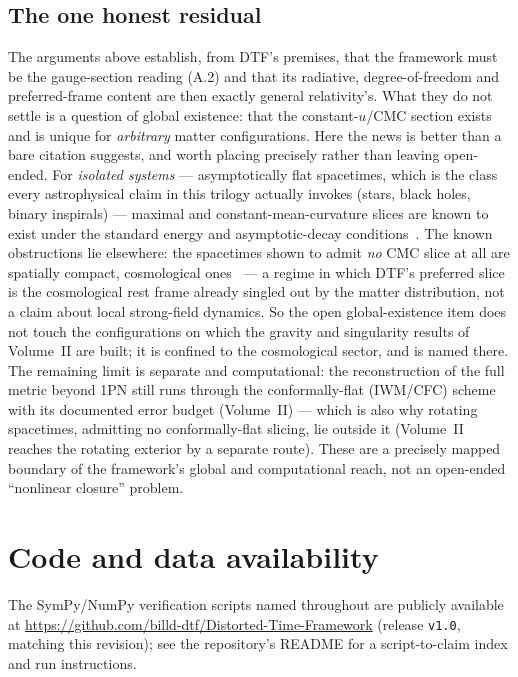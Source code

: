 \documentclass[11pt]{article}
\begin{document}
\subsection*{The one honest residual}
The arguments above establish, from DTF's premises, that the framework must be the gauge-section reading
(A.2) and that its radiative, degree-of-freedom and preferred-frame content are then exactly general
relativity's. What they do not settle is a question of global existence: that the constant-$u$/CMC section
exists and is unique for \emph{arbitrary} matter configurations. Here the news is better than a bare
citation suggests, and worth placing precisely rather than leaving open-ended. For \emph{isolated systems}
--- asymptotically flat spacetimes, which is the class every astrophysical claim in this trilogy actually
invokes (stars, black holes, binary inspirals) --- maximal and constant-mean-curvature slices are known to
exist under the standard energy and asymptotic-decay conditions~\cite{Bartnik1984,MarsdenTipler1980,Gerhardt1983}.
The known obstructions lie elsewhere: the spacetimes shown to admit \emph{no} CMC slice at all are
spatially compact, cosmological ones~\cite{Bartnik1988} --- a regime in which DTF's preferred slice is the
cosmological rest frame already singled out by the matter distribution, not a claim about local strong-field
dynamics. So the open global-existence item does not touch the configurations on which the gravity and
singularity results of Volume~II are built; it is confined to the cosmological sector, and is named there.
The remaining limit is separate and computational: the reconstruction of the full metric beyond 1PN still
runs through the conformally-flat (IWM/CFC) scheme with its documented error budget (Volume~II) --- which is
also why rotating spacetimes, admitting no conformally-flat slicing, lie outside it (Volume~II reaches the
rotating exterior by a separate route). These are a precisely mapped boundary of the framework's global and
computational reach, not an open-ended ``nonlinear closure'' problem.

\section*{Code and data availability}
{\small The SymPy/NumPy verification scripts named throughout are publicly available at
\url{https://github.com/billd-dtf/Distorted-Time-Framework} (release \texttt{v1.0}, matching this
revision); see the repository's README for a script-to-claim index and run instructions.\par}
\end{document}
